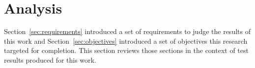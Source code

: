 \section{Analysis}\label{sec:analysis}

Section~\ref{sec:requirements} introduced a set of requirements to judge the
results of this work and Section~\ref{sec:objectives} introduced a set of
objectives this research targeted for completion. This section reviews those
sections in the context of test results produced for this work.

%
%
%

